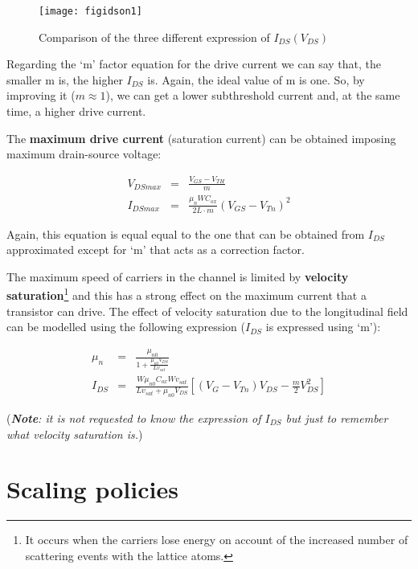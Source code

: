 \documentclass[a4paper, 12pt, twoside, openright]{report}
\begin{document}
	\begin{figure}[H]
	\centering
	\texttt{[image: figidson1]}
	\caption{Comparison of the three different expression of $I_{DS}(V_{DS})$}
	\label{}
	\end{figure}

Regarding the `m' factor equation for the drive current we can say that, the smaller m is, the higher $I_{DS}$ is. Again, the ideal value of m is one. So, by improving it ($m \approx 1$), we can get a lower subthreshold current and, at the same time, a higher drive current.

The \textbf{maximum drive current} (saturation current) can be obtained imposing maximum drain-source voltage:

	\begin{eqnarray*}
	     V_{DSmax} &=& \frac{V_{GS} - V_{TH}}{m}\\
	   I_{DSmax} &=& \frac{\mu_n W C_{ox}}{2L \cdot  {m}}\left(V_{GS}-V_{Tn}\right)^2
	\end{eqnarray*}

Again, this equation is equal equal to the one that can be obtained from $I_{DS}$ approximated except for `m' that acts as a correction factor.

The maximum speed of carriers in the channel is limited by \textbf{velocity saturation}\footnote{It occurs when the carriers lose energy on account of the increased number of scattering events with the lattice atoms.} and this has a strong effect on the maximum current that a transistor can drive. The effect of velocity saturation due to the longitudinal field can be modelled using the following expression ($I_{DS}$ is expressed using `m'):

	\begin{eqnarray*}
	     \mu_n&=&\frac{\mu_{n0}}{1+\frac{\mu_{n0}V_{DS}}{Lv_{sat}}}\\[2ex]
	   I_{DS} &=&\frac{W \mu_{n0} C_{ox}Wv_{sat}}{Lv_{sat}+\mu_{n0}V_{DS}}
	             \left[\left(V_G-V_{Tn}\right)V_{DS}-\frac{ {m}}{2}V_{DS}^2\right]
	\end{eqnarray*}

(\emph{\textbf{Note}: it is not requested to know the expression of $I_{DS}$ but just to remember what velocity saturation is.})


\section{Scaling policies}
\end{document}
